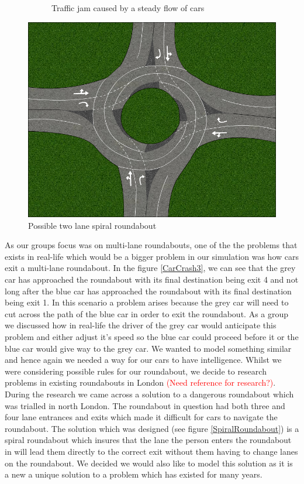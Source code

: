 \documentclass{article}
\begin{document}
\begin{figure}
\begin{subfigure}[h ]{0.5\textwidth}
        \caption{Traffic jam caused by a steady flow of cars}
        \label{steadyFlow}
    \end{subfigure}
    \caption{}
\end{figure}

\begin{figure}[h]
     \centering \includegraphics[width=.6\textwidth]{spiralRoundabout}
        \caption{Possible two lane spiral roundabout}
        \label{spiralRoundabout}
\end{figure}
	 
	As our groups focus was on multi-lane roundabouts, one of the the problems that exists in real-life which would be a bigger problem in our simulation was how cars exit a multi-lane roundabout. In the figure \ref{CarCrash3}, we can see that  the grey car has approached the roundabout with its final destination being exit 4 and not long after the blue car has approached the roundabout with its final destination being exit 1. In this scenario a problem arises because the grey car will need to cut across the path of the blue car in order to exit the roundabout. As a group we discussed how in real-life the driver of the grey car would anticipate this problem and either adjust it's speed so the blue car could proceed before it or the blue car would give way to the grey car. We wanted to model something similar and hence again we needed a way for our cars to have intelligence. Whilst we were considering possible rules for our roundabout, we decide to research problems in existing roundabouts in London \textcolor{red}{(Need reference for research?)}. During the research we came across a solution to a dangerous roundabout which was trialled in north London. The roundabout in question had both three and four lane entrances and exits which made it difficult for cars to navigate the roundabout. The solution which was designed (see figure \ref{SpiralRoundabout}) is a spiral roundabout which insures that the lane the person enters the roundabout in will lead them directly to the correct exit without them having to change lanes on the roundabout. We decided we would also like to model this solution as it is a new a unique solution to a problem which has existed for many years. 
    
\end{document}
